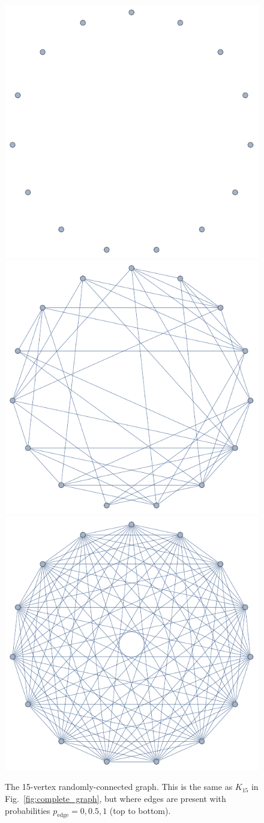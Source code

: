 \documentclass[aps,rmp,twocolumn,amsmath,amssymb,nofootinbib,superscriptaddress]{revtex4}
\begin{document}
\begin{figure}[!htb]
\includegraphics[width=0.6\columnwidth]{random_0}
\includegraphics[width=0.6\columnwidth]{random_05}
\includegraphics[width=0.6\columnwidth]{random_1}
\caption{The 15-vertex randomly-connected graph. This is the same as $K_{15}$ in Fig.~\ref{fig:complete_graph}, but where edges are present with probabilities \mbox{$p_\mathrm{edge}=0,0.5,1$} (top to bottom).} \label{fig:random_graph}
\end{figure}
\end{document}
